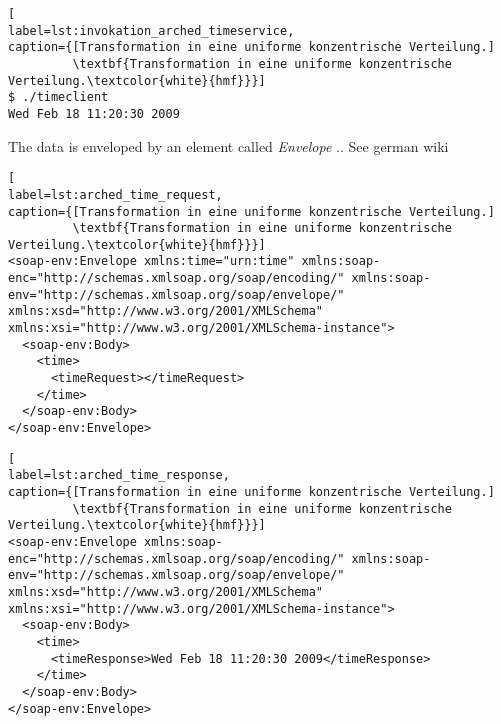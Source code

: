 \begin{minipage}[t]{\textwidth}
\begin{lstlisting}[
label=lst:invokation_arched_timeservice,
caption={[Transformation in eine uniforme konzentrische Verteilung.]
         \textbf{Transformation in eine uniforme konzentrische Verteilung.\textcolor{white}{hmf}}}]
$ ./timeclient
Wed Feb 18 11:20:30 2009
\end{lstlisting}
\end{minipage}



The data is enveloped by an element called \textit{Envelope} .. See german wiki

\begin{minipage}[t]{\textwidth}
\begin{lstlisting}[
label=lst:arched_time_request,
caption={[Transformation in eine uniforme konzentrische Verteilung.]
         \textbf{Transformation in eine uniforme konzentrische Verteilung.\textcolor{white}{hmf}}}]
<soap-env:Envelope xmlns:time="urn:time" xmlns:soap-enc="http://schemas.xmlsoap.org/soap/encoding/" xmlns:soap-env="http://schemas.xmlsoap.org/soap/envelope/" xmlns:xsd="http://www.w3.org/2001/XMLSchema" xmlns:xsi="http://www.w3.org/2001/XMLSchema-instance">
  <soap-env:Body>
    <time>
      <timeRequest></timeRequest>
    </time>
  </soap-env:Body>
</soap-env:Envelope>
\end{lstlisting}
\end{minipage}


\begin{minipage}[t]{\textwidth}
\begin{lstlisting}[
label=lst:arched_time_response,
caption={[Transformation in eine uniforme konzentrische Verteilung.]
         \textbf{Transformation in eine uniforme konzentrische Verteilung.\textcolor{white}{hmf}}}]
<soap-env:Envelope xmlns:soap-enc="http://schemas.xmlsoap.org/soap/encoding/" xmlns:soap-env="http://schemas.xmlsoap.org/soap/envelope/" xmlns:xsd="http://www.w3.org/2001/XMLSchema" xmlns:xsi="http://www.w3.org/2001/XMLSchema-instance">
  <soap-env:Body>
    <time>
      <timeResponse>Wed Feb 18 11:20:30 2009</timeResponse>
    </time>
  </soap-env:Body>
</soap-env:Envelope>
\end{lstlisting}
\end{minipage}













